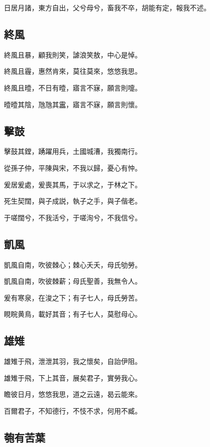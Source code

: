 日居月諸，東方自出，父兮母兮，畜我不卒，胡能有定，報我不述。

\subsection[終風]{終風}

終風且暴，顧我則笑，謔浪笑敖，中心是悼。

終風且霾，惠然肯來，莫往莫來，悠悠我思。

終風且曀，不日有曀，寤言不寐，願言則嚏。

曀曀其陰，虺虺其靁，寤言不寐，願言則懷。

\subsection[擊鼓]{擊鼓}

擊鼓其鏜，踴躍用兵，土國城漕，我獨南行。

從孫子仲，平陳與宋，不我以歸，憂心有忡。

爰居爰處，爰喪其馬，于以求之，于林之下。

死生契闊，與子成説，執子之手，與子偕老。

于嗟闊兮，不我活兮，于嗟洵兮，不我信兮。

\subsection[凱風]{凱風}

凱風自南，吹彼棘心；棘心夭夭，母氏劬勞。

凱風自南，吹彼棘薪；母氏聖善，我無令人。

爰有寒泉，在浚之下；有子七人，母氏勞苦。

睍睆黄鳥，載好其音；有子七人，莫慰母心。

\subsection[雄雉]{雄雉}

雄雉于飛，泄泄其羽，我之懷矣，自詒伊阻。

雄雉于飛，下上其音，展矣君子，實勞我心。

瞻彼日月，悠悠我思，道之云遠，曷云能來。

百爾君子，不知德行，不忮不求，何用不臧。

\subsection[匏有苦葉]{匏有苦葉}

